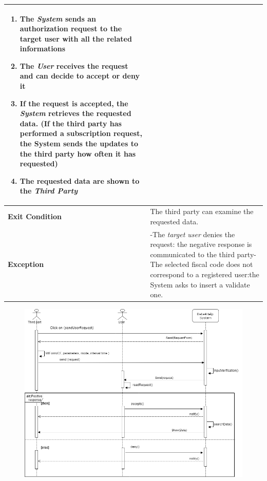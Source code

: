 \begin{table}[H]
\begin{tabular}{|p{3.5cm}|p{10.3cm}|}
\begin{enumerate}[leftmargin=0.5cm]
                            \item The \emph{System} sends an authorization request to the target user with all the related informations
                                            
                                            \item  The  \emph{User} receives the request and can decide to accept or deny it
                                            \item If the request is accepted, the \emph{System} retrieves the requested data. (If the third party has performed a subscription request, the System sends the updates to the third party how often it has requested)
                                            \item The requested data are shown to the \emph{Third Party}
                                
                                          \end{enumerate}
    										\\
    \hline
    \textbf{\large{Exit Condition}} 	& The third party can examine the requested data. \\
    
    \hline
    \textbf{\large{Exception}} 			& -The \emph{target user} denies the request: the negative response is communicated to the third party\newline -The selected fiscal code does not correspond to a registered user:the System asks to insert a validate one.\\
    
    \hline
    
    
    \end{tabular}
	
\end{table}

\begin{figure}[H]
    \centering
    \includegraphics[scale=0.4]{rasdL/Pictures/request1.png}
  
\end{figure}